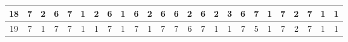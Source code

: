 \begin{sidewaystable}[]
\begin{tabular}{|c|c|c|c|c|c|c|c|c|c|c|c|c|c|c|c|c|c|c|c|c|c|c|c|c|}
    18      & 7                                               & 2                                               & 6                                               & 7                                               & 1                                               & 2                                               & 6                                               & 1                                               & 6                                               & 2                                                & 6                                                & 6                                                & 2                                               & 6                                               & 2                                               & 3                                               & 6                                               & 7                                               & 1                                               & 7                                               & 2                                               & 7                                                & 1                                                & 1                                                \\ \hline
    19      & 7                                               & 1                                               & 7                                               & 7                                               & 1                                               & 1                                               & 7                                               & 1                                               & 7                                               & 1                                                & 7                                                & 7                                                & 6                                               & 7                                               & 1                                               & 1                                               & 7                                               & 5                                               & 1                                               & 7                                               & 2                                               & 7                                                & 1                                                & 1                                                \\ \hline

\end{tabular}
\end{sidewaystable}
